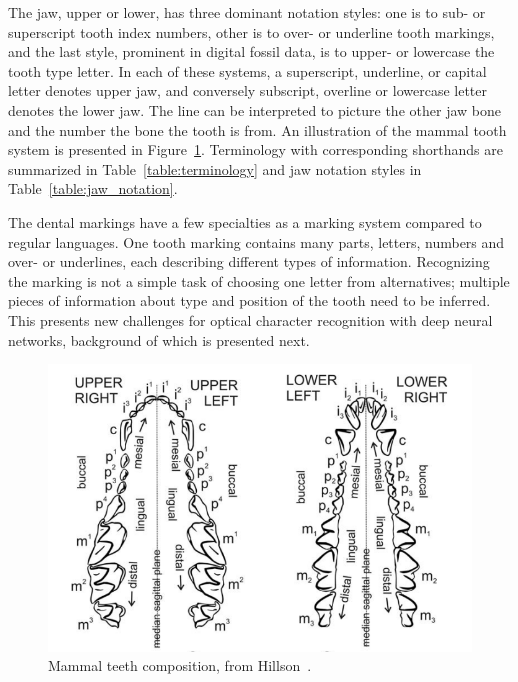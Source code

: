 \documentclass[english,twoside,openright]{UH_DS_MSc}
\begin{document}
The jaw, upper or lower, has three dominant notation styles: one is to sub- or superscript tooth index numbers, other is to 
over- or underline tooth markings, and the last style, prominent in digital fossil data, is to upper- or lowercase the tooth type letter.
In each of these systems, a superscript, underline, or capital letter denotes upper jaw, and conversely subscript, overline or lowercase letter denotes the lower jaw. The line can be interpreted to picture the other jaw bone and the number the bone the tooth is from.
An illustration of the mammal tooth system is presented in Figure~\ref{image:mammal_teeth}. Terminology with corresponding shorthands are summarized in Table~\ref{table:terminology} and jaw notation styles in Table~\ref{table:jaw_notation}.

The dental markings have a few specialties as a marking system compared to regular languages. One tooth marking contains many parts, letters, numbers and over- or underlines, each describing different types of information. Recognizing the marking is not a simple task of choosing one letter from alternatives; multiple pieces of information about type and position of the tooth need to be inferred. This presents new challenges for optical character recognition with deep neural networks, background of 
which is presented next.

\begin{figure}[ht]
    \centering
    \includegraphics*[scale=0.43]{images/teeth_img_hillson_book.png}
    \caption{Mammal teeth composition, from Hillson~\cite{Hillson_2005}.}
    \label{image:mammal_teeth}
\end{figure}
\end{document}
